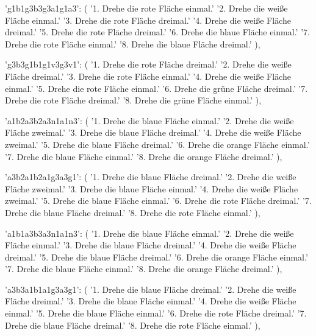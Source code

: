 {{        'g1b1g3b3g3a1g1a3': (
            '1. Drehe die rote Fläche einmal.\n'
            '2. Drehe die weiße Fläche einmal.\n'
            '3. Drehe die rote Fläche dreimal.\n'
            '4. Drehe die weiße Fläche dreimal.\n'
            '5. Drehe die rote Fläche dreimal.\n'
            '6. Drehe die blaue Fläche einmal.\n'
            '7. Drehe die rote Fläche einmal.\n'
            '8. Drehe die blaue Fläche dreimal.'
        ),

        'g3b3g1b1g1v3g3v1': (
            '1. Drehe die rote Fläche dreimal.\n'
            '2. Drehe die weiße Fläche dreimal.\n'
            '3. Drehe die rote Fläche einmal.\n'
            '4. Drehe die weiße Fläche einmal.\n'
            '5. Drehe die rote Fläche einmal.\n'
            '6. Drehe die grüne Fläche dreimal.\n'
            '7. Drehe die rote Fläche dreimal.\n'
            '8. Drehe die grüne Fläche einmal.'
        ),

        'a1b2a3b2a3n1a1n3': (
            '1. Drehe die blaue Fläche einmal.\n'
            '2. Drehe die weiße Fläche zweimal.\n'
            '3. Drehe die blaue Fläche dreimal.\n'
            '4. Drehe die weiße Fläche zweimal.\n'
            '5. Drehe die blaue Fläche dreimal.\n'
            '6. Drehe die orange Fläche einmal.\n'
            '7. Drehe die blaue Fläche einmal.\n'
            '8. Drehe die orange Fläche dreimal.'
        ),

        'a3b2a1b2a1g3a3g1': (
            '1. Drehe die blaue Fläche dreimal.\n'
            '2. Drehe die weiße Fläche zweimal.\n'
            '3. Drehe die blaue Fläche einmal.\n'
            '4. Drehe die weiße Fläche zweimal.\n'
            '5. Drehe die blaue Fläche einmal.\n'
            '6. Drehe die rote Fläche dreimal.\n'
            '7. Drehe die blaue Fläche dreimal.\n'
            '8. Drehe die rote Fläche einmal.'
        ),

        'a1b1a3b3a3n1a1n3': (
            '1. Drehe die blaue Fläche einmal.\n'
            '2. Drehe die weiße Fläche einmal.\n'
            '3. Drehe die blaue Fläche dreimal.\n'
            '4. Drehe die weiße Fläche dreimal.\n'
            '5. Drehe die blaue Fläche dreimal.\n'
            '6. Drehe die orange Fläche einmal.\n'
            '7. Drehe die blaue Fläche einmal.\n'
            '8. Drehe die orange Fläche dreimal.'
        ),

        'a3b3a1b1a1g3a3g1': (
            '1. Drehe die blaue Fläche dreimal.\n'
            '2. Drehe die weiße Fläche dreimal.\n'
            '3. Drehe die blaue Fläche einmal.\n'
            '4. Drehe die weiße Fläche einmal.\n'
            '5. Drehe die blaue Fläche einmal.\n'
            '6. Drehe die rote Fläche dreimal.\n'
            '7. Drehe die blaue Fläche dreimal.\n'
            '8. Drehe die rote Fläche einmal.'
        ),

}}
